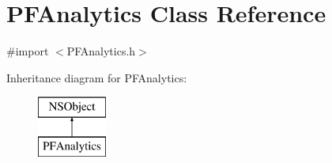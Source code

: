 \hypertarget{interface_p_f_analytics}{}\section{P\+F\+Analytics Class Reference}
\label{interface_p_f_analytics}


{\ttfamily \#import $<$P\+F\+Analytics.\+h$>$}

Inheritance diagram for P\+F\+Analytics\+:\begin{figure}[H]
\begin{center}
\leavevmode
\includegraphics[height=2.000000cm]{interface_p_f_analytics}
\end{center}
\end{figure}
